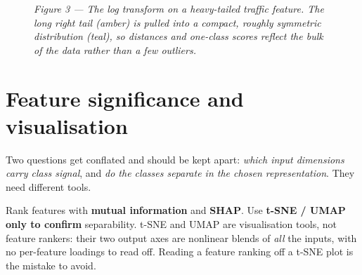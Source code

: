 \documentclass[11pt,a4paper]{article}
\begin{document}
\begin{figure}[H]
\centering
{}
\caption*{\small\textit{Figure 3 --- The log transform on a heavy-tailed traffic feature. The long right tail (amber) is pulled into a compact, roughly symmetric distribution (teal), so distances and one-class scores reflect the bulk of the data rather than a few outliers.}}
\end{figure}

\section{Feature significance and visualisation}

Two questions get conflated and should be kept apart: \emph{which input dimensions carry class signal}, and \emph{do the classes separate in the chosen representation}. They need different tools.

\begin{tcolorbox}[idea]
Rank features with \textbf{mutual information} and \textbf{SHAP}. Use \textbf{t-SNE / UMAP only to confirm} separability. t-SNE and UMAP are visualisation tools, not feature rankers: their two output axes are nonlinear blends of \emph{all} the inputs, with no per-feature loadings to read off. Reading a feature ranking off a t-SNE plot is the mistake to avoid.
\end{tcolorbox}
\end{document}
